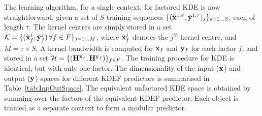 
The learning algorithm, for a single context, for factored KDE is now straightforward, given a set of $S$ training sequences $\{ (\hat{\mathbf{x}}^{1:\tau} , \hat{\mathbf{y}}^{1:\tau})_s \}_{s = 1 \ldots S}$, each of length $\tau$. The kernel centres are simply stored in a set $\mathcal{K} = \{ ( \hat{\mathbf{x}}^j_f ,  \hat{\mathbf{y}}^j_f ) \, \forall f \in F \}_{ j = 1 \ldots M}$, where $\hat{\mathbf{x}}^j_f$ denotes the $j^{th}$ kernel centre, and $M= \tau \times S$. A kernel bandwidth is computed for $\mathbf{x}_f$ and $\mathbf{y}_f$ for each factor $f$, and stored in a set $\mathcal{H} = \{ (\mathbf{H}^{\mathbf{x}_f},  \mathbf{H}^{\mathbf{y}_f} ) \}_{f \in F}$. The training procedure for KDE is identical, but with only one factor. The dimensionality of the input ($\mathbf{x}$) and output ($\mathbf{y}$) spaces for different KDEF predictors is summarised in Table~\ref{tab:InpOutSpace}. The equivalent unfactored KDE space is obtained by summing over the factors of the equivalent KDEF predictor. Each object is trained as a separate context to form a modular predictor.
